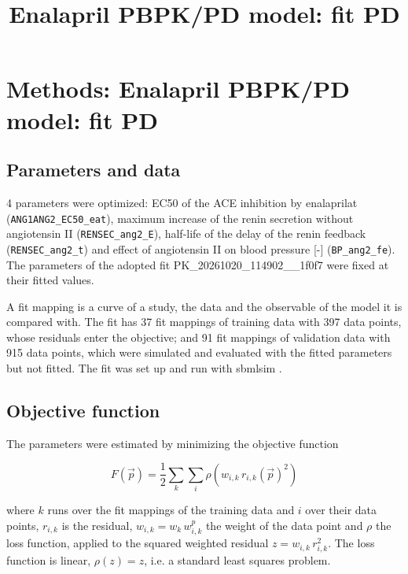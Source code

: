 \documentclass{article}
\title{Enalapril PBPK/PD model: fit PD}
\date{}
\begin{document}
\maketitle

\section{Methods: Enalapril PBPK/PD model: fit PD}

\subsection{Parameters and data}

4 parameters were optimized: EC50 of the ACE inhibition by enalaprilat (\texttt{ANG1ANG2\_EC50\_eat}), maximum increase of the renin secretion without angiotensin II (\texttt{RENSEC\_ang2\_E}), half-life of the delay of the renin feedback (\texttt{RENSEC\_ang2\_t}) and effect of angiotensin II on blood pressure [-] (\texttt{BP\_ang2\_fe}). The parameters of the adopted fit PK\_20261020\_114902\_\_1f0f7 were fixed at their fitted values.

A fit mapping is a curve of a study, the data and the observable of the model it is compared with. The fit has 37 fit mappings of training data with 397 data points, whose residuals enter the objective; and 91 fit mappings of validation data with 915 data points, which were simulated and evaluated with the fitted parameters but not fitted. The fit was set up and run with sbmlsim \cite{Koenig2026_sbmlsim}.

\subsection{Objective function}

The parameters were estimated by minimizing the objective function

\begin{equation}
F(\vec{p}) = \frac{1}{2} \sum_{k} \sum_{i} \rho\left(w_{i,k}\, r_{i,k}(\vec{p})^2\right)
\end{equation}

where $k$ runs over the fit mappings of the training data and $i$ over their data points, $r_{i,k}$ is the residual, $w_{i,k} = w_k\, w^{p}_{i,k}$ the weight of the data point and $\rho$ the loss function, applied to the squared weighted residual $z = w_{i,k}\, r_{i,k}^2$. The loss function is linear, $\rho(z) = z$, i.e. a standard least squares problem.
\end{document}
